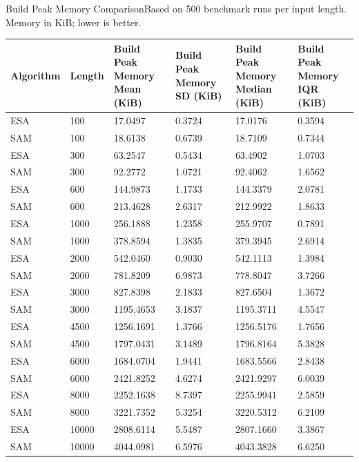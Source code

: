 \begin{benchmarktable}{Build Peak Memory Comparison}{Based on 500 benchmark runs per input length. Memory in KiB; lower is better.}
\begin{tabularx}{\textwidth}{|X|X|X|X|X|X|}
\toprule
Algorithm & Length & Build Peak Memory Mean (KiB) & Build Peak Memory SD (KiB) & Build Peak Memory Median (KiB) & Build Peak Memory IQR (KiB) \\
\midrule
ESA & 100 & 17.0497 & 0.3724 & 17.0176 & 0.3594 \\
SAM & 100 & 18.6138 & 0.6739 & 18.7109 & 0.7344 \\
\hline
ESA & 300 & 63.2547 & 0.5434 & 63.4902 & 1.0703 \\
SAM & 300 & 92.2772 & 1.0721 & 92.4062 & 1.6562 \\
\hline
ESA & 600 & 144.9873 & 1.1733 & 144.3379 & 2.0781 \\
SAM & 600 & 213.4628 & 2.6317 & 212.9922 & 1.8633 \\
\hline
ESA & 1000 & 256.1888 & 1.2358 & 255.9707 & 0.7891 \\
SAM & 1000 & 378.8594 & 1.3835 & 379.3945 & 2.6914 \\
\hline
ESA & 2000 & 542.0460 & 0.9030 & 542.1113 & 1.3984 \\
SAM & 2000 & 781.8209 & 6.9873 & 778.8047 & 3.7266 \\
\hline
ESA & 3000 & 827.8398 & 2.1833 & 827.6504 & 1.3672 \\
SAM & 3000 & 1195.4653 & 3.1837 & 1195.3711 & 4.5547 \\
\hline
ESA & 4500 & 1256.1691 & 1.3766 & 1256.5176 & 1.7656 \\
SAM & 4500 & 1797.0431 & 3.1489 & 1796.8164 & 5.3828 \\
\hline
ESA & 6000 & 1684.0704 & 1.9441 & 1683.5566 & 2.8438 \\
SAM & 6000 & 2421.8252 & 4.6274 & 2421.9297 & 6.0039 \\
\hline
ESA & 8000 & 2252.1638 & 8.7397 & 2255.9941 & 2.5859 \\
SAM & 8000 & 3221.7352 & 5.3254 & 3220.5312 & 6.2109 \\
\hline
ESA & 10000 & 2808.6114 & 5.5487 & 2807.1660 & 3.3867 \\
SAM & 10000 & 4044.0981 & 6.5976 & 4043.3828 & 6.6250 \\
\bottomrule
\end{tabularx}
\end{benchmarktable}

